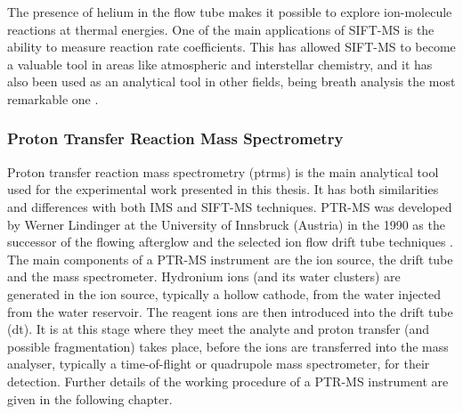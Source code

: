 The presence of helium in the flow tube makes it possible to explore ion-molecule reactions at thermal energies. One of the main applications of SIFT-MS is the ability to measure reaction rate coefficients. This has allowed SIFT-MS to become a valuable tool in areas like atmospheric and interstellar chemistry, and it has also been used as an analytical tool in other fields, being breath analysis the most remarkable one \cite{turner2006longitudinal}.





\subsubsection{Proton Transfer Reaction Mass Spectrometry}
Proton transfer reaction mass spectrometry (\acrshort{ptrms}) is the main analytical tool used for the experimental work presented in this thesis.
It has both similarities and differences with both IMS and SIFT-MS techniques. PTR-MS was developed by Werner Lindinger at the University of Innsbruck (Austria) in the 1990 as the successor of the flowing afterglow  and the selected ion flow drift tube techniques \cite{RN601}.
The main components of a PTR-MS instrument are the ion source, the drift tube and the mass spectrometer.
Hydronium ions (and its water clusters) are generated in the ion source, typically a hollow cathode, from the water injected from the water reservoir. The reagent ions are then introduced into the drift tube (\acrshort{dt}). It is at this stage where they meet the analyte and proton transfer (and possible fragmentation) takes place, before the ions  are transferred into the mass analyser, typically a time-of-flight or quadrupole mass spectrometer, for their detection. Further details of the working procedure of a PTR-MS instrument are given in the following chapter.

